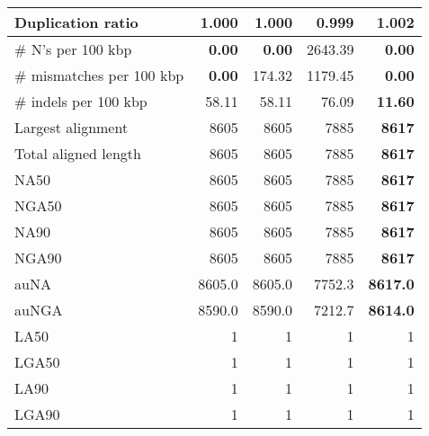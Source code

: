 \documentclass[12pt,a4paper]{article}
\begin{document}
\begin{table}[ht]
\begin{center}
\begin{tabular}{|l*{4}{|r}|}
Duplication ratio & 1.000 & 1.000 & {\bf 0.999} & 1.002 \\ \hline
\# N's per 100 kbp & {\bf 0.00} & {\bf 0.00} & 2643.39 & {\bf 0.00} \\ \hline
\# mismatches per 100 kbp & {\bf 0.00} & 174.32 & 1179.45 & {\bf 0.00} \\ \hline
\# indels per 100 kbp & 58.11 & 58.11 & 76.09 & {\bf 11.60} \\ \hline
Largest alignment & 8605 & 8605 & 7885 & {\bf 8617} \\ \hline
Total aligned length & 8605 & 8605 & 7885 & {\bf 8617} \\ \hline
NA50 & 8605 & 8605 & 7885 & {\bf 8617} \\ \hline
NGA50 & 8605 & 8605 & 7885 & {\bf 8617} \\ \hline
NA90 & 8605 & 8605 & 7885 & {\bf 8617} \\ \hline
NGA90 & 8605 & 8605 & 7885 & {\bf 8617} \\ \hline
auNA & 8605.0 & 8605.0 & 7752.3 & {\bf 8617.0} \\ \hline
auNGA & 8590.0 & 8590.0 & 7212.7 & {\bf 8614.0} \\ \hline
LA50 & 1 & 1 & 1 & 1 \\ \hline
LGA50 & 1 & 1 & 1 & 1 \\ \hline
LA90 & 1 & 1 & 1 & 1 \\ \hline
LGA90 & 1 & 1 & 1 & 1 \\ \hline
\end{tabular}
\end{center}
\end{table}
\end{document}
